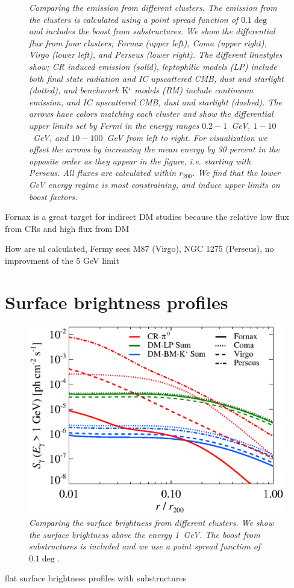 \documentclass[10pt,aps,pra,reprint,amsmath,amsfonts,amssymb,showpacs]{revtex4-1}
\newcommand{\rmn}{\mathrm}
\newcommand{\Kp}{\rmn{K}`}
\newcommand{\rvir}{r_{200}}
\begin{document}
\begin{figure}
\begin{minipage}{2.0\columnwidth}
\caption{\it Comparing the emission from different clusters. The
  emission from the clusters is calculated using a point spread
  function of $0.1\deg$ and includes the boost from substructures. We
  show the differential flux from four clusters; Fornax (upper left),
  Coma (upper right), Virgo (lower left), and Perseus (lower
  right). The different linestyles show; CR induced emission (solid),
  leptophilic models (LP) include both final state radiation and IC
  upscattered CMB, dust and starlight (dotted), and benchmark $\Kp$
  models (BM) include continuum emission, and IC upscattered CMB, dust
  and starlight (dashed). The arrows have colors matching each
  cluster and show the differential upper limits set by Fermi in the
  energy ranges $0.2-1$~GeV, $1-10$~GeV, and $10-100$~GeV from left to
  right. For visualization we offset the arrows by increasing the mean
  energy by 30 percent in the opposite order as they appear in the
  figure, i.e. starting with Perseus. All fluxes are calculated within
  $\rvir$. We find that the lower GeV energy regime is most
  constraining, and induce upper limits on boost factors.}
 \label{fig9}
\end{minipage}
\end{figure}
Fornax is a great target for indirect DM studies because the relative
 low flux from CRs and high flux from DM

How are ul calculated, Fermy sees M87 (Virgo), NGC 1275 (Perseus), no improvment of the 5 GeV limit


\section{Surface brightness profiles}

\begin{figure}
 \includegraphics[width=0.99\columnwidth]{figures/SB.v9.1GeV.SF300.SubMass.elmu.eps}
\caption{\it Comparing the surface brightness from different
  clusters. We show the surface brightness above the energy 1~GeV. The
  boost from substructures is included and we use a point spread
  function of $0.1\deg$.}
 \label{fig20}
\end{figure}
flat surface brightness profiles with substructures
\end{document}
